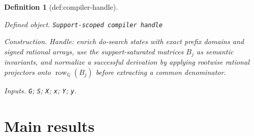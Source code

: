 \documentclass{article}
\newtheorem{definition}{Definition}
\begin{document}
\begin{definition}[def:compiler-handle]\label{def:compiler-handle}
\par\smallskip\noindent\emph{Defined object.} \texttt{Support-\allowbreak{}scoped compiler handle}
\par\smallskip\noindent\emph{Construction.} Handle: enrich do-search states with exact prefix domains and signed rational arrays, use the support-saturated matrices \(B_j\) as semantic invariants, and normalize a successful derivation by applying rootwise rational projectors onto \(\operatorname{row}_{\mathbb Q}(B_j)\) before extracting a common denominator.
\par\smallskip\noindent\emph{Inputs.} \texttt{G}; \texttt{S}; \texttt{X}; \texttt{x}; \texttt{Y}; \texttt{y}.
\end{definition}

\section{Main results}
\end{document}
